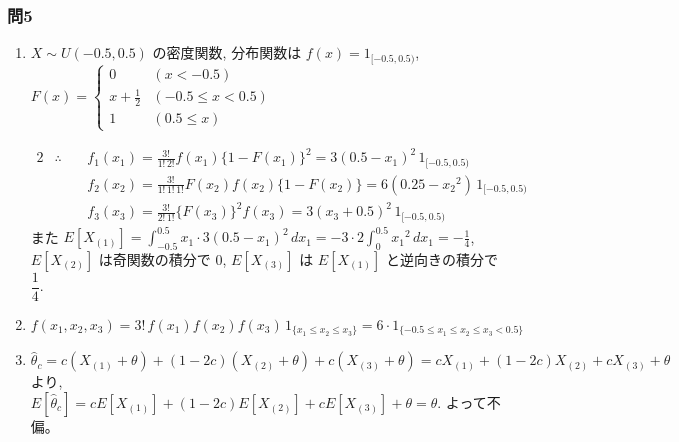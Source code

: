 \documentclass[./main.tex]{subfiles}
\begin{document}
    \subsubsection*{問5}


    \begin{enumerate}
        \item $X\sim U(-0.5, 0.5)$ の密度関数, 分布関数は
        $f(x) = 1_{ [ -0.5, 0.5) }$,
        $F(x) = \begin{cases}
            0 & (x < -0.5)\\
            x + \frac{1}{2} & (-0.5 \leq x < 0.5)\\
            1 & (0.5 \leq x)
        \end{cases}$


        \begin{alignat*}{2}
        &\therefore &\ &f_1 (x_1) = \frac{3!}{1!\,2!} f(x_1) \{ 1 - F(x_1) \}^2
            = 3 \left( 0.5 - x_1 \right)^2 \, 1_{[-0.5, 0.5)}\\
        &&&f_2 (x_2) = \frac{3!}{1! \, 1! \, 1!} F(x_2) f(x_2) \{ 1 - F(x_2) \}
            = 6 (0.25 - {x_2}^2) \, 1_{[-0.5, 0.5)}\\
        &&&f_3 (x_3) = \frac{3!}{2! \, 1!} \{ F(x_3) \}^2 f(x_3)
            = 3 (x_3 + 0.5)^2 \, 1_{[-0.5, 0.5)}
        \end{alignat*}
        また $\displaystyle E[X_{(1)}] = \int_{-0.5}^{0.5} x_1 \cdot 3 (0.5 - x_1)^2 \, dx_1
            = -3 \cdot 2 \int_0^{0.5} {x_1}^2 \, d x_1
            = - \frac{1}{4}$, 
        $E [X_{(2)}]$ は奇関数の積分で $0$, $E [X_{(3)}]$ は $E [X_{(1)}]$ と逆向きの積分で $\dfrac{1}{4}$.



        \item $f(x_1, x_2, x_3) = 3! \, f(x_1) f(x_2) f(x_3) \, 1_{\{ x_1 \leq x_2 \leq x_3 \}}
            = 6 \cdot 1_{\{ -0.5 \leq x_1 \leq x_2 \leq x_3 < 0.5 \}}$

        \item $\hat{\theta}_c
            = c (X_{(1)} + \theta) + (1 - 2c) (X_{(2)} + \theta) + c(X_{(3)} + \theta)
            = c X_{(1)} + (1 - 2c) X_{(2)} + c X_{(3)} + \theta$ より, \\
            $E [\hat{\theta}_c] = c E[X_{(1)}] + (1 - 2c) E[X_{(2)}] + c E[X_{(3)} ] + \theta
                = \theta$.
            よって不偏。
        

\end{enumerate}
\end{document}
